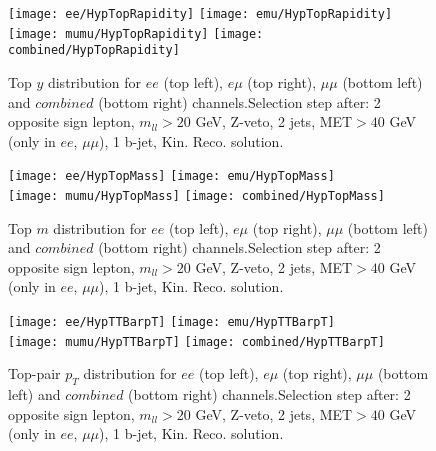 \clearpage
\newpage

\begin{figure}
  \texttt{[image: ee/HypTopRapidity]}
  \texttt{[image: emu/HypTopRapidity]}\\
  \texttt{[image: mumu/HypTopRapidity]}
  \texttt{[image: combined/HypTopRapidity]}
\caption{Top $y$ distribution for $ee$ (top left), $e\mu$ (top right), $\mu\mu$ (bottom left) and $combined$ (bottom right) channels.\newline Selection step after: 2 opposite sign lepton, $m_{ll}>20$ GeV, Z-veto, 2 jets, MET$>40$ GeV (only in $ee$, $\mu\mu$), 1 b-jet, Kin. Reco. solution.}
\end{figure}

\clearpage
\newpage


\begin{figure}
  \texttt{[image: ee/HypTopMass]}
  \texttt{[image: emu/HypTopMass]}\\
  \texttt{[image: mumu/HypTopMass]}
  \texttt{[image: combined/HypTopMass]}
\caption{Top $m$ distribution for $ee$ (top left), $e\mu$ (top right), $\mu\mu$ (bottom left) and $combined$ (bottom right) channels.\newline Selection step after: 2 opposite sign lepton, $m_{ll}>20$ GeV, Z-veto, 2 jets, MET$>40$ GeV (only in $ee$, $\mu\mu$), 1 b-jet, Kin. Reco. solution.}
\end{figure}

\clearpage
\newpage




\begin{figure}
  \texttt{[image: ee/HypTTBarpT]}
  \texttt{[image: emu/HypTTBarpT]}\\
  \texttt{[image: mumu/HypTTBarpT]}
  \texttt{[image: combined/HypTTBarpT]}
\caption{Top-pair $p_T$ distribution for $ee$ (top left), $e\mu$ (top right), $\mu\mu$ (bottom left) and $combined$ (bottom right) channels.\newline Selection step after: 2 opposite sign lepton, $m_{ll}>20$ GeV, Z-veto, 2 jets, MET$>40$ GeV (only in $ee$, $\mu\mu$), 1 b-jet, Kin. Reco. solution.}
\end{figure}

